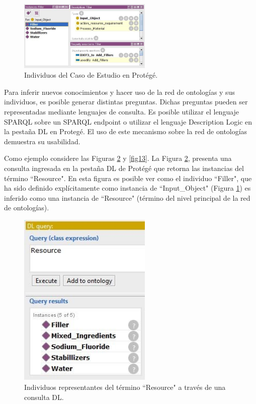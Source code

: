 \documentclass[journal]{IEEEtran}
\begin{document}
\begin{figure}[!t]
\centering
\includegraphics[width=2.5in]{figures/figure11.jpg}
\caption{Individuos del Caso de Estudio en Prot\'eg\'e.}
\label{fig11}
\end{figure}

Para inferir nuevos conocimientos y hacer uso de la red de ontolog\'ias y sus individuos, es posible generar distintas preguntas. Dichas preguntas pueden ser representadas mediante lenguajes de consulta. Es posible utilizar el lenguaje SPARQL sobre un SPARQL endpoint o utilizar el lenguaje Description Logic en la pestaña DL en Proteg\'e. El uso de este mecanismo sobre la red de ontolog\'ias demuestra su usabilidad. 

Como ejemplo considere las Figuras \ref{fig12} y \ref{fig13}. La Figura \ref{fig12}, presenta una consulta ingresada en la pestaña DL de Prot\'eg\'e que retorna las instancias del t\'ermino ``Resource". En esta figura es posible ver como el individuo ``Filler", que ha sido definido expl\'icitamente como instancia de ``Input\_Object" (Figura \ref{fig11}) es inferido como una instancia de ``Resource" (t\'ermino del nivel principal de la red de ontolog\'ias).


\begin{figure}[!t]
\centering
\includegraphics[width=2.5in]{figures/figure12.jpg}
\caption{Individuos representantes del t\'ermino ``Resource" a trav\'es de una consulta DL.}
\label{fig12}
\end{figure}
\end{document}
